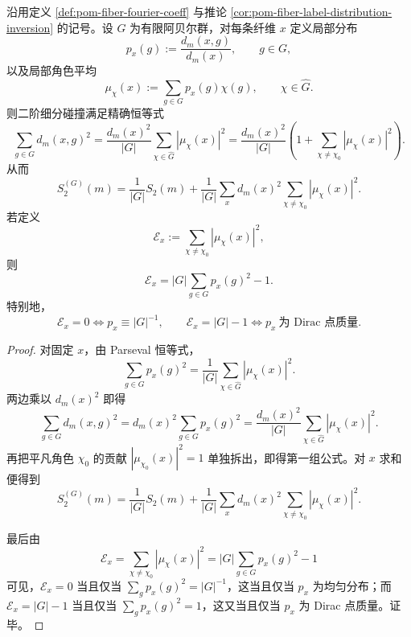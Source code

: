 \begin{theorem}\label{thm:conclusion-second-refined-collision-exact-fourier-energy}
沿用定义 \ref{def:pom-fiber-fourier-coeff} 与推论 \ref{cor:pom-fiber-label-distribution-inversion} 的记号。设 \(G\) 为有限阿贝尔群，对每条纤维 \(x\) 定义局部分布
\[
p_x(g):=\frac{d_m(x,g)}{d_m(x)},
\qquad g\in G,
\]
以及局部角色平均
\[
\mu_\chi(x):=\sum_{g\in G}p_x(g)\chi(g),
\qquad \chi\in\widehat G.
\]
则二阶细分碰撞满足精确恒等式
\[
\sum_{g\in G}d_m(x,g)^2
=
\frac{d_m(x)^2}{|G|}
\sum_{\chi\in\widehat G}|\mu_\chi(x)|^2
=
\frac{d_m(x)^2}{|G|}
\left(
1+\sum_{\chi\neq\chi_0}|\mu_\chi(x)|^2
\right).
\]
从而
\[
S_2^{(G)}(m)
=
\frac1{|G|}S_2(m)
+
\frac1{|G|}\sum_x d_m(x)^2\sum_{\chi\neq\chi_0}|\mu_\chi(x)|^2.
\]
若定义
\[
\mathcal E_x:=\sum_{\chi\neq\chi_0}|\mu_\chi(x)|^2,
\]
则
\[
\mathcal E_x=|G|\sum_{g\in G}p_x(g)^2-1.
\]
特别地，
\[
\mathcal E_x=0\iff p_x\equiv |G|^{-1},
\qquad
\mathcal E_x=|G|-1\iff p_x\ \text{为 Dirac 点质量}.
\]
\end{theorem}
\begin{proof}
对固定 \(x\)，由 Parseval 恒等式，
\[
\sum_{g\in G}p_x(g)^2
=
\frac1{|G|}\sum_{\chi\in\widehat G}|\mu_\chi(x)|^2.
\]
两边乘以 \(d_m(x)^2\) 即得
\[
\sum_{g\in G}d_m(x,g)^2
=
d_m(x)^2\sum_{g\in G}p_x(g)^2
=
\frac{d_m(x)^2}{|G|}\sum_{\chi\in\widehat G}|\mu_\chi(x)|^2.
\]
再把平凡角色 \(\chi_0\) 的贡献 \(|\mu_{\chi_0}(x)|^2=1\) 单独拆出，即得第一组公式。对 \(x\) 求和便得到
\[
S_2^{(G)}(m)
=
\frac1{|G|}S_2(m)+\frac1{|G|}\sum_x d_m(x)^2\sum_{\chi\neq\chi_0}|\mu_\chi(x)|^2.
\]

最后由
\[
\mathcal E_x
=
\sum_{\chi\neq\chi_0}|\mu_\chi(x)|^2
=
|G|\sum_{g\in G}p_x(g)^2-1
\]
可见，\(\mathcal E_x=0\) 当且仅当 \(\sum_g p_x(g)^2=|G|^{-1}\)，这当且仅当 \(p_x\) 为均匀分布；而 \(\mathcal E_x=|G|-1\) 当且仅当 \(\sum_g p_x(g)^2=1\)，这又当且仅当 \(p_x\) 为 Dirac 点质量。证毕。
\end{proof}

